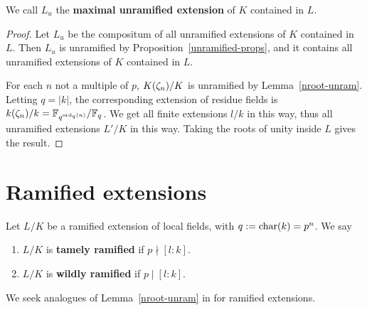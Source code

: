 We call $L_u$ the \textbf{maximal unramified extension} of $K$ contained in $L$. %
\begin{proof}
Let $L_u$ be the compositum of all unramified extensions of $K$ contained in $L$. Then $L_u$ is unramified by Proposition~\ref{unramified-props}, and it contains all unramified extensions of $K$ contained in $L$.

For each $n$ not a multiple of $p$, $K(\zeta_n)/K$ is unramified by Lemma~\ref{nroot-unram}. Letting $q=|k|$, the corresponding extension of residue fields is $k(\zeta_n)/k=\mathbb{F}_{q^{\operatorname{ord}_q(n)}}/\mathbb{F}_q$. We get all finite extensions $l/k$ in this way, thus all unramified extensions $L'/K$ in this way. Taking the roots of unity inside $L$ gives the result.
\end{proof}
\section{Ramified extensions}
\begin{df}
Let $L/K$ be a ramified extension of local fields, with $q:=\operatorname{char}(k)=p^n$. We say
\begin{enumerate}
\item
$L/K$ is \textbf{tamely ramified} if $p\nmid [l:k]$.
\item
$L/K$ is \textbf{wildly ramified} if $p\mid[l:k]$.
\end{enumerate}
\end{df}
We seek analogues of Lemma~\ref{nroot-unram} in for ramified extensions.

